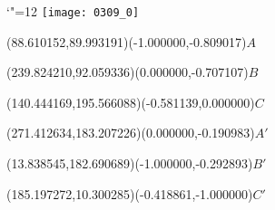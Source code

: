 \documentclass[12pt]{article}
\begin{document}
\makeatletter%
\let\ASYencoding\f@encoding%
\let\ASYfamily\f@family%
\let\ASYseries\f@series%
\let\ASYshape\f@shape%
\makeatother%
{\catcode`"=12%
\texttt{[image: 0309\_0]}%
}%
\kern -284.527559pt%
%
%
\fontsize{12.000000}{14.400000}\selectfont%
\usefont{\ASYencoding}{\ASYfamily}{\ASYseries}{\ASYshape}%
\ASYalign(88.610152,89.993191)(-1.000000,-0.809017){$A$}%
%
%
\fontsize{12.000000}{14.400000}\selectfont%
\ASYalign(239.824210,92.059336)(0.000000,-0.707107){$B$}%
%
%
\fontsize{12.000000}{14.400000}\selectfont%
\ASYalign(140.444169,195.566088)(-0.581139,0.000000){$C$}%
%
%
\fontsize{12.000000}{14.400000}\selectfont%
\ASYalign(271.412634,183.207226)(0.000000,-0.190983){$A'$}%
%
%
\fontsize{12.000000}{14.400000}\selectfont%
\ASYalign(13.838545,182.690689)(-1.000000,-0.292893){$B'$}%
%
%
\fontsize{12.000000}{14.400000}\selectfont%
\ASYalign(185.197272,10.300285)(-0.418861,-1.000000){$C'$}%
\end{document}
